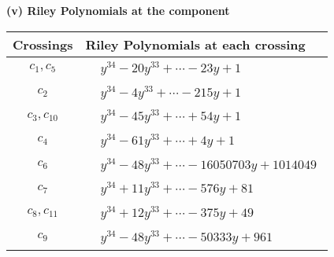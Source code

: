 \documentclass[1p]{elsarticle_modified}
\theoremstyle{definition}
\begin{document}
\newpage\renewcommand{\arraystretch}{1}
\flushleft \textbf{(v) Riley Polynomials at the component}\newline \\
\begin{tabular}{m{50pt}|m{274pt}}
Crossings & \hspace{64pt}Riley Polynomials at each crossing \\
\hline $$\begin{aligned}c_{1},c_{5}\end{aligned}$$&$\begin{aligned}
&y^{34}-20 y^{33}+\cdots-23 y+1
\end{aligned}$\\
\hline $$\begin{aligned}c_{2}\end{aligned}$$&$\begin{aligned}
&y^{34}-4 y^{33}+\cdots-215 y+1
\end{aligned}$\\
\hline $$\begin{aligned}c_{3},c_{10}\end{aligned}$$&$\begin{aligned}
&y^{34}-45 y^{33}+\cdots+54 y+1
\end{aligned}$\\
\hline $$\begin{aligned}c_{4}\end{aligned}$$&$\begin{aligned}
&y^{34}-61 y^{33}+\cdots+4 y+1
\end{aligned}$\\
\hline $$\begin{aligned}c_{6}\end{aligned}$$&$\begin{aligned}
&y^{34}-48 y^{33}+\cdots-16050703 y+1014049
\end{aligned}$\\
\hline $$\begin{aligned}c_{7}\end{aligned}$$&$\begin{aligned}
&y^{34}+11 y^{33}+\cdots-576 y+81
\end{aligned}$\\
\hline $$\begin{aligned}c_{8},c_{11}\end{aligned}$$&$\begin{aligned}
&y^{34}+12 y^{33}+\cdots-375 y+49
\end{aligned}$\\
\hline $$\begin{aligned}c_{9}\end{aligned}$$&$\begin{aligned}
&y^{34}-48 y^{33}+\cdots-50333 y+961
\end{aligned}$\\
\hline
\end{tabular}\\~\\
\end{document}
